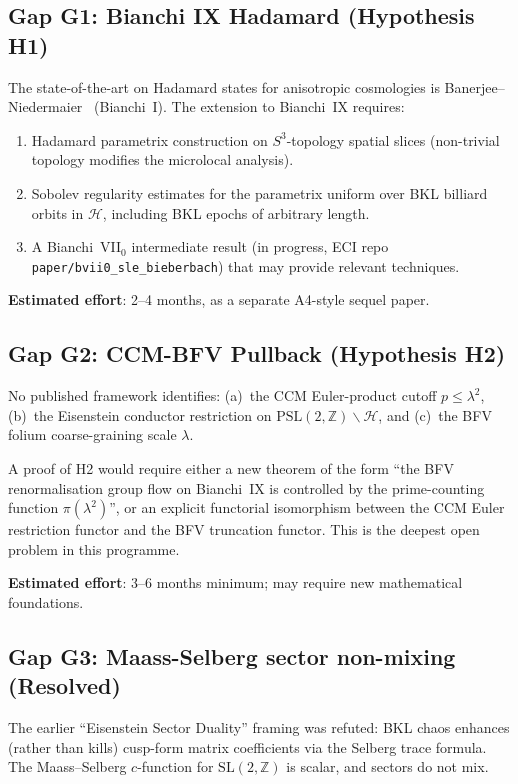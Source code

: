 \documentclass[11pt]{article}
\newcommand{\PSL}{\mathrm{PSL}}
\newcommand{\SL}{\mathrm{SL}}
\newcommand{\Lam}{\lambda}
\begin{document}
\subsection{Gap G1: Bianchi IX Hadamard (Hypothesis H1)}

The state-of-the-art on Hadamard states for anisotropic cosmologies is
Banerjee--Niedermaier~\cite{BN2023} (Bianchi~I). The extension to
Bianchi~IX requires:
\begin{enumerate}
\item Hadamard parametrix construction on $S^3$-topology spatial slices
  (non-trivial topology modifies the microlocal analysis).
\item Sobolev regularity estimates for the parametrix uniform over
  BKL billiard orbits in $\mathcal{H}$, including BKL epochs of
  arbitrary length.
\item A Bianchi~VII$_0$ intermediate result (in progress, ECI repo
  \texttt{paper/bvii0\_sle\_bieberbach}) that may provide relevant
  techniques.
\end{enumerate}

\textbf{Estimated effort}: 2--4 months, as a separate A4-style sequel paper.

\subsection{Gap G2: CCM-BFV Pullback (Hypothesis H2)}

No published framework identifies:
(a)~the CCM Euler-product cutoff $p \le \Lam^2$,
(b)~the Eisenstein conductor restriction on $\PSL(2,\mathbb{Z})\backslash\mathcal{H}$, and
(c)~the BFV folium coarse-graining scale $\Lam$.

A proof of H2 would require either a new theorem of the form
``the BFV renormalisation group flow on Bianchi~IX is controlled by the
prime-counting function $\pi(\Lam^2)$'', or an explicit functorial
isomorphism between the CCM Euler restriction functor and the BFV
truncation functor. This is the deepest open problem in this programme.

\textbf{Estimated effort}: 3--6 months minimum; may require new mathematical
foundations.

\subsection{Gap G3: Maass-Selberg sector non-mixing (Resolved)}

The earlier ``Eisenstein Sector Duality'' framing was refuted: BKL chaos
enhances (rather than kills) cusp-form matrix coefficients via the
Selberg trace formula. The Maass--Selberg $c$-function for $\SL(2,\mathbb{Z})$
is scalar, and sectors do not mix.
\end{document}
